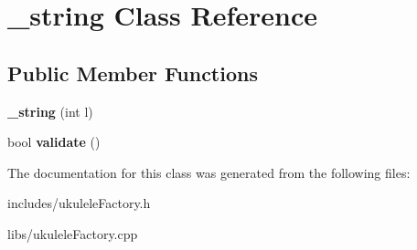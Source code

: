 \hypertarget{class__string}{}\section{\+\_\+string Class Reference}
\label{class__string}
\subsection*{Public Member Functions}
\begin{DoxyCompactItemize}
\item 
\hypertarget{class__string_a803cea6abfcb73f78c1844a63feb21db}{}\label{class__string_a803cea6abfcb73f78c1844a63feb21db} 
{\bfseries \+\_\+string} (int l)
\item 
\hypertarget{class__string_ae4521ca840ebf069efa7132c14e16366}{}\label{class__string_ae4521ca840ebf069efa7132c14e16366} 
bool {\bfseries validate} ()
\end{DoxyCompactItemize}


The documentation for this class was generated from the following files\+:\begin{DoxyCompactItemize}
\item 
includes/ukulele\+Factory.\+h\item 
libs/ukulele\+Factory.\+cpp\end{DoxyCompactItemize}
